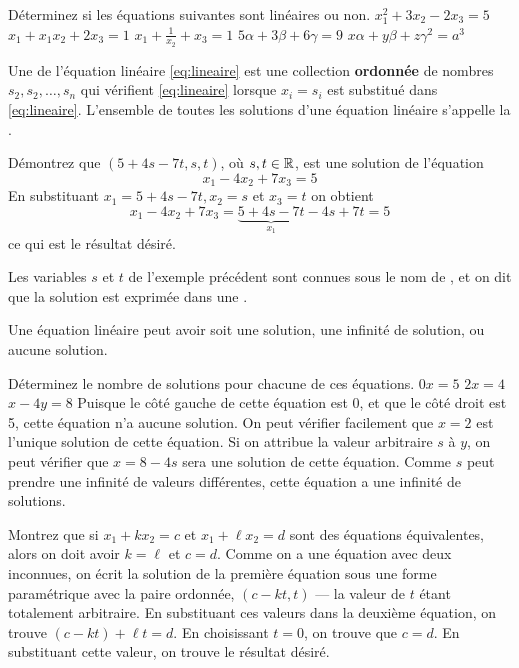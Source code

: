 \begin{exerciceB}
	Déterminez si les équations suivantes sont linéaires ou non.
	 $x_1^2 + 3x_2 - 2x_3 = 5$
	 $x_1 + x_1x_2 + 2x_3 = 1$
	 $x_1 + \displaystyle\frac{1}{x_2} + x_3 = 1$
	 $5\alpha + 3\beta + 6\gamma = 9$
	 $x\alpha + y\beta + z\gamma^2 = a^3$
\end{exerciceB}

Une  de l'équation linéaire \eqref{eq:lineaire} est une collection \textbf{ordonnée} de nombres
$s_2, s_2, \ldots, s_n$ qui vérifient  \eqref{eq:lineaire} lorsque $x_i = s_i$ est substitué dans \eqref{eq:lineaire}.
L'ensemble de toutes les solutions d'une équation linéaire s'appelle la .

\begin{exemple}
	Démontrez que $(5 + 4s - 7t, s, t)$, où $s, t \in\mathbb{R}$, est une solution de l'équation
	\[
	x_1 - 4x_2 + 7x_3 = 5
	\]
	\solution
	En substituant $x_1 = 5+4s - 7t, x_2=s$ et $x_3=t$ on obtient
	\[
	x_1 - 4x_2 + 7x_3 =
	\underbrace{5+4s-7t}_{x_1} - 4s+ 7t = 5
	\]
	ce qui est le résultat désiré.
	\end{exemple}
	Les variables $s$ et $t$ de l'exemple précédent sont connues sous le nom de ,
	et on dit que la solution est exprimée dans une .

	Une équation linéaire peut avoir soit une solution, une infinité de solution, ou aucune solution.
	\begin{exemple}
	Déterminez le nombre de solutions pour chacune de ces équations.
	 $0x = 5$
	 $2x = 4$
	 $x - 4y = 8$
	\solution
	 Puisque le côté gauche de cette équation est 0, et que le côté droit est 5, cette équation n'a aucune solution.
	 On peut vérifier facilement que $x=2$ est l'unique solution de cette équation.
	 Si on attribue la valeur arbitraire $s$ à $y$, on peut vérifier que $x= 8 - 4s$ sera une solution de cette équation.
	Comme $s$ peut prendre une infinité de valeurs différentes, cette équation a une infinité de solutions.
\end{exemple}
%

\begin{exemple}
	Montrez que si $x_1+kx_2 = c$ et $x_1 + \ell x_2 = d$ sont des équations équivalentes, alors on doit avoir
	$k = \ell$ et $c=d$.
	\solution
	Comme on a une équation avec deux inconnues, on écrit la solution de la première équation sous une
	forme paramétrique avec la
	paire ordonnée, $(c-kt, t)$ --- la valeur de $t$ étant totalement arbitraire.  En substituant ces valeurs
	dans la deuxième équation, on trouve
	$
	(c-kt) + \ell t = d.
	$
	En choisissant $t=0$, on trouve que $c=d$.  En substituant cette valeur, on trouve le résultat désiré.
\end{exemple}

